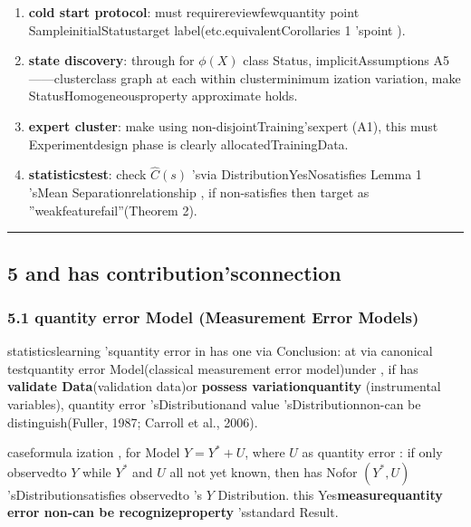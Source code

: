\documentclass[
  12pt,
]{article}
\begin{document}
\begin{enumerate}
\def\labelenumi{\arabic{enumi}.}
\item
  \textbf{cold start protocol}: must requirereviewfewquantity point SampleinitialStatustarget label(etc.equivalentCorollaries
  1 'spoint ). 
\item
  \textbf{state discovery}: through for  \(\phi(X)\) class Status, implicitAssumptions
  A5------clusterclass graph at each within clusterminimum ization variation, make StatusHomogeneousproperty approximate holds. 
\item
  \textbf{expert cluster}: make using non-disjointTraining'sexpert (A1), this must Experimentdesign phase is clearly allocatedTrainingData. 
\item
  \textbf{statisticstest}: check \(\hat{C}(s)\) 'svia DistributionYesNosatisfies  Lemma 1
  'sMean Separationrelationship , if non-satisfies then target as ''weakfeaturefail''(Theorem 2). 
\end{enumerate}

\begin{center}\rule{0.5\linewidth}{0.5pt}\end{center}

\subsection{5
and has contribution'sconnection}\label{ux4e0eux73b0ux6709ux6587ux732eux7684ux8054ux7cfb}

\subsubsection{5.1 quantity error Model (Measurement Error
Models)}\label{ux6d4bux91cfux8befux5deeux6a21ux578b-measurement-error-models}

statisticslearning 'squantity error in has one via Conclusion: at via canonical testquantity error Model(classical
measurement error model)under , if has \textbf{validate Data}(validation
data)or \textbf{possess variationquantity }(instrumental
variables), quantity error 'sDistributionand value 'sDistributionnon-can be distinguish(Fuller, 1987; Carroll
et al., 2006). 

caseformula ization , for Model \(Y = Y^* + U\), where \(U\) as quantity error : if only observedto 
\(Y\) while  \(Y^*\) and  \(U\) all not yet known, then has Nofor  \((Y^*, U)\)
'sDistributionsatisfies observedto 's \(Y\)
Distribution. this Yes\textbf{measurequantity error non-can be recognizeproperty }'sstandard Result. 
\end{document}
